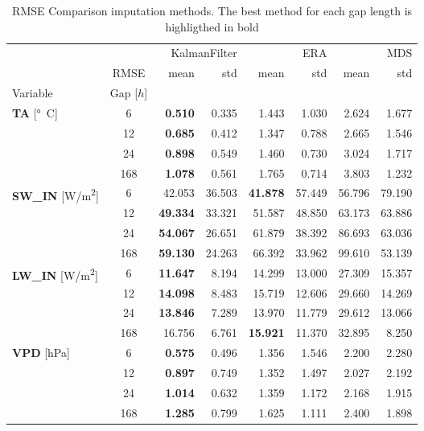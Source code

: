 \begin{table}
\centering
\caption{RMSE Comparison imputation methods. The best method for each gap length is highligthed in bold}
\label{the_table}
\begin{tabular}{p{2.1cm}c|rr|rr|rr}
\toprule
 &  & \multicolumn{2}{r}{KalmanFilter} & \multicolumn{2}{r}{ERA} & \multicolumn{2}{r}{MDS} \\
 & RMSE & mean & std & mean & std & mean & std \\
Variable & Gap [$h$] &  &  &  &  &  &  \\
\midrule
\multirow[c]{4}{*}{\parbox{2.1cm}{\textbf{TA} [\si{°C}]}} & 6 & \bfseries 0.510 & 0.335 & 1.443 & 1.030 & 2.624 & 1.677 \\
 & 12 & \bfseries 0.685 & 0.412 & 1.347 & 0.788 & 2.665 & 1.546 \\
 & 24 & \bfseries 0.898 & 0.549 & 1.460 & 0.730 & 3.024 & 1.717 \\
 & 168 & \bfseries 1.078 & 0.561 & 1.765 & 0.714 & 3.803 & 1.232 \\
\cline{1-8}
\multirow[c]{4}{*}{\parbox{2.1cm}{\textbf{SW\_IN} [\si{W/m^2}]}} & 6 & 42.053 & 36.503 & \bfseries 41.878 & 57.449 & 56.796 & 79.190 \\
 & 12 & \bfseries 49.334 & 33.321 & 51.587 & 48.850 & 63.173 & 63.886 \\
 & 24 & \bfseries 54.067 & 26.651 & 61.879 & 38.392 & 86.693 & 63.036 \\
 & 168 & \bfseries 59.130 & 24.263 & 66.392 & 33.962 & 99.610 & 53.139 \\
\cline{1-8}
\multirow[c]{4}{*}{\parbox{2.1cm}{\textbf{LW\_IN} [\si{W/m^2}]}} & 6 & \bfseries 11.647 & 8.194 & 14.299 & 13.000 & 27.309 & 15.357 \\
 & 12 & \bfseries 14.098 & 8.483 & 15.719 & 12.606 & 29.660 & 14.269 \\
 & 24 & \bfseries 13.846 & 7.289 & 13.970 & 11.779 & 29.612 & 13.066 \\
 & 168 & 16.756 & 6.761 & \bfseries 15.921 & 11.370 & 32.895 & 8.250 \\
\cline{1-8}
\multirow[c]{4}{*}{\parbox{2.1cm}{\textbf{VPD} [\si{hPa}]}} & 6 & \bfseries 0.575 & 0.496 & 1.356 & 1.546 & 2.200 & 2.280 \\
 & 12 & \bfseries 0.897 & 0.749 & 1.352 & 1.497 & 2.027 & 2.192 \\
 & 24 & \bfseries 1.014 & 0.632 & 1.359 & 1.172 & 2.168 & 1.915 \\
 & 168 & \bfseries 1.285 & 0.799 & 1.625 & 1.111 & 2.400 & 1.898 \\

\end{tabular}
\end{table}
